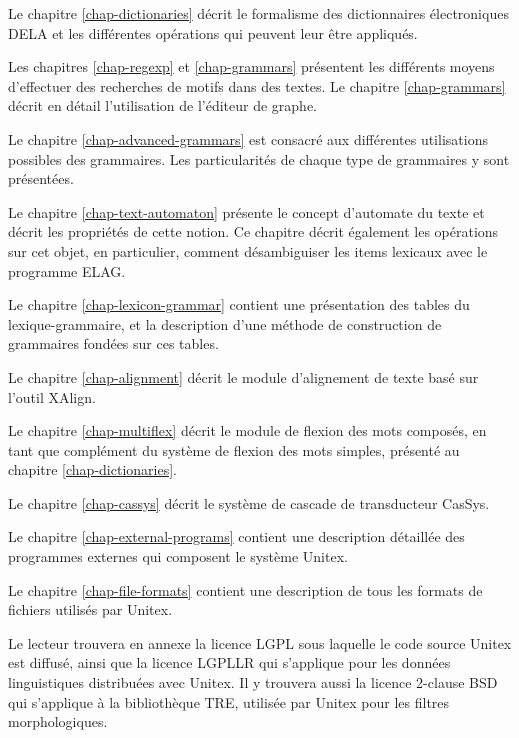 \bigskip \noindent Le chapitre \ref{chap-dictionaries} décrit le formalisme 
des dictionnaires électroniques DELA et les différentes opérations qui peuvent leur être appliqués.

\bigskip \noindent Les chapitres \ref{chap-regexp} et \ref{chap-grammars}
présentent les différents moyens d’effectuer des recherches de motifs dans des textes.
Le chapitre \ref{chap-grammars} décrit en détail l'utilisation de l'éditeur de graphe.

\bigskip \noindent Le chapitre \ref{chap-advanced-grammars} est consacré aux différentes
utilisations possibles des grammaires. Les particularités de chaque type de grammaires y sont
présentées.

\bigskip \noindent Le chapitre \ref{chap-text-automaton} présente le concept d'automate du texte 
et décrit les propriétés de cette notion. Ce chapitre  décrit également les opérations sur cet
objet, en particulier, comment désambiguiser les items lexicaux avec le programme ELAG.

\bigskip \noindent Le chapitre \ref{chap-lexicon-grammar} contient une présentation des tables du
lexique-grammaire, et la description d'une méthode de construction de  grammaires fondées sur ces
tables.

\bigskip \noindent Le chapitre \ref{chap-alignment} décrit le module d'alignement de texte basé sur
l'outil XAlign.

\bigskip \noindent Le chapitre \ref{chap-multiflex} décrit le module de flexion des mots composés,
en tant que complément du système de flexion des mots simples, présenté au chapitre
\ref{chap-dictionaries}.

\bigskip \noindent Le chapitre \ref{chap-cassys} décrit le système de cascade de transducteur
CasSys.

\bigskip \noindent Le chapitre \ref{chap-external-programs} contient une description détaillée des
programmes externes qui composent le système Unitex.

\bigskip \noindent Le chapitre \ref{chap-file-formats} contient une description de tous les formats
de fichiers utilisés par Unitex.


\bigskip \noindent Le lecteur trouvera en annexe la licence LGPL sous  laquelle le code source
Unitex est diffusé, ainsi que la licence LGPLLR qui s'applique pour les données linguistiques
distribuées avec Unitex. Il y trouvera aussi la licence 2-clause BSD qui s'applique à la
bibliothèque TRE, utilisée par Unitex pour les filtres morphologiques.


